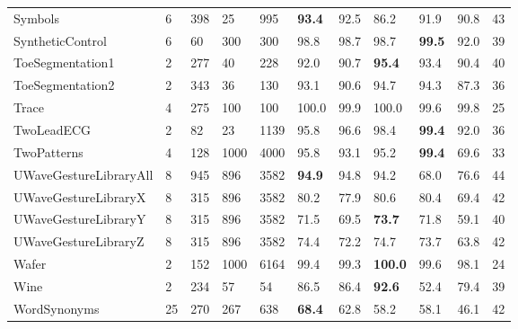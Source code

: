 \documentclass[runningheads]{llncs}
\begin{document}
\begin{table}[t]
\begin{tabular}{>{\tiny}lllll|lllll|l}
		Symbols                        & 6         & 398       & 25      & 995    & \textbf{93.4} & 92.5  & 86.2           & 91.9          & 90.8  & 43          \\
		SyntheticControl               & 6         & 60        & 300     & 300    & 98.8 & 98.7           & 98.7           & \textbf{99.5} & 92.0  & 39          \\
		ToeSegmentation1               & 2         & 277       & 40      & 228    & 92.0 & 90.7          & \textbf{95.4}  & 93.4          & 90.4  & 40          \\
		ToeSegmentation2               & 2         & 343       & 36      & 130    & 93.1 & 90.6           & 94.7           & 94.3          & 87.3  & 36          \\
		Trace                          & 4         & 275       & 100     & 100    & 100.0 & 99.9          & 100.0          & 99.6          & 99.8  & 25          \\
		TwoLeadECG                     & 2         & 82        & 23      & 1139   & 95.8 & 96.6          & 98.4           & \textbf{99.4} & 92.0  & 36          \\
		TwoPatterns                    & 4         & 128       & 1000    & 4000   & 95.8 & 93.1           & 95.2           & \textbf{99.4} & 69.6  & 33          \\
		UWaveGestureLibraryAll         & 8         & 945       & 896     & 3582   & \textbf{94.9} & 94.8 & 94.2           & 68.0          & 76.6  & 44          \\
		UWaveGestureLibraryX           & 8         & 315       & 896     & 3582   & 80.2 & 77.9          & 80.6           & 80.4          & 69.4  & 42          \\
		UWaveGestureLibraryY           & 8         & 315       & 896     & 3582   & 71.5 & 69.5           & \textbf{73.7}  & 71.8          & 59.1  & 40          \\
		UWaveGestureLibraryZ           & 8         & 315       & 896     & 3582   & 74.4 & 72.2          & 74.7           & 73.7          & 63.8  & 42          \\
		Wafer                          & 2         & 152       & 1000    & 6164   & 99.4 & 99.3          & \textbf{100.0} & 99.6          & 98.1  & 24          \\
		Wine                           & 2         & 234       & 57      & 54     & 86.5 & 86.4           & \textbf{92.6}  & 52.4          & 79.4  & 39          \\
		WordSynonyms                   & 25        & 270       & 267     & 638    & \textbf{68.4} & 62.8  & 58.2           & 58.1          & 46.1  & 42          \\

\end{tabular}
\end{table}
\end{document}
